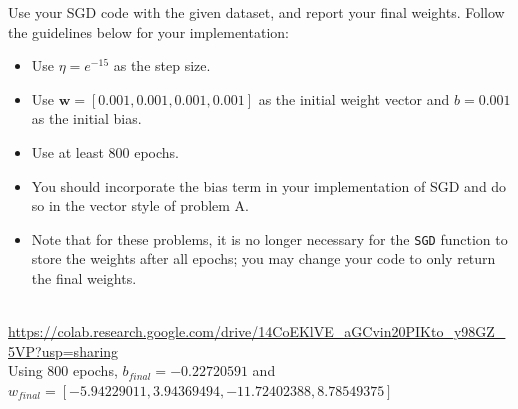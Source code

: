 \begin{problem}[6]
  Use your SGD code with the given dataset, and report your final weights. Follow the guidelines below for your implementation:

  \begin{itemize}
    \item Use $\eta = e^{-15}$ as the step size.  
    \item Use $\mathbf{w} = [0.001, 0.001, 0.001, 0.001]$ as the initial weight vector and $b = 0.001$ as the initial bias.
    \item Use at least 800 epochs.
    \item You should incorporate the bias term in your implementation of SGD and do so in the vector style of problem A.
    \item Note that for these problems, it is no longer necessary for the \texttt{SGD} function to store the weights after all epochs; you may change your code to only return the final weights.
  \end{itemize}
\end{problem}
\begin{solution}
  \\
  \url{https://colab.research.google.com/drive/14CoEKlVE_aGCvin20PIKto_y98GZ_5VP?usp=sharing} \\
  Using 800 epochs, $b_{final} = -0.22720591$ and $w_{final} = [-5.94229011, 3.94369494, -11.72402388, 8.78549375]$
  
\end{solution}

